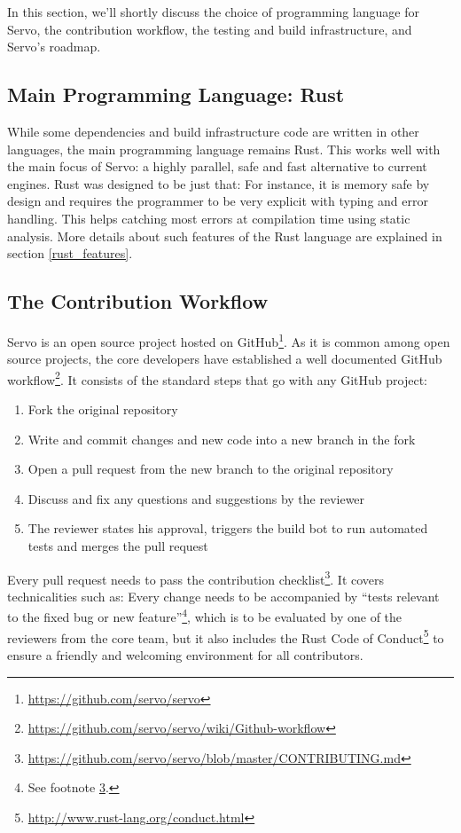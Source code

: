 \documentclass{scrartcl}
\begin{document}
In this section, we'll shortly discuss the choice of programming language for Servo, the contribution workflow, the testing and build infrastructure, and Servo's roadmap.


\subsection{Main Programming Language: Rust}

While some dependencies and build infrastructure code are written in other languages, the main programming language remains Rust. This works well with the main focus of Servo: a highly parallel, safe and fast alternative to current engines. Rust was designed to be just that: For instance, it is memory safe by design and requires the programmer to be very explicit with typing and error handling. This helps catching most errors at compilation time using static analysis. More details about such features of the Rust language are explained in section \ref{rust_features}.


\subsection{The Contribution Workflow}

Servo is an open source project hosted on GitHub\footnote{\url{https://github.com/servo/servo}}. As it is common among open source projects, the core developers have established a well documented GitHub workflow\footnote{\url{https://github.com/servo/servo/wiki/Github-workflow}}. It consists of the standard steps that go with any GitHub project:
\begin{enumerate}
    \item Fork the original repository
    \item Write and commit changes and new code into a new branch in the fork
    \item Open a pull request from the new branch to the original repository
    \item Discuss and fix any questions and suggestions by the reviewer
    \item The reviewer states his approval, triggers the build bot to run automated tests and merges the pull request
\end{enumerate}

Every pull request needs to pass the contribution checklist\footnote{\label{contributing}\url{https://github.com/servo/servo/blob/master/CONTRIBUTING.md}}. It covers technicalities such as: Every change needs to be accompanied by ``tests relevant to the fixed bug or new feature''\footnote{See footnote \ref{contributing}.},  which is to be evaluated by one of the reviewers from the core team, but it also includes the Rust Code of Conduct\footnote{\url{http://www.rust-lang.org/conduct.html}} to ensure a friendly and welcoming environment for all contributors.
  
\end{document}
